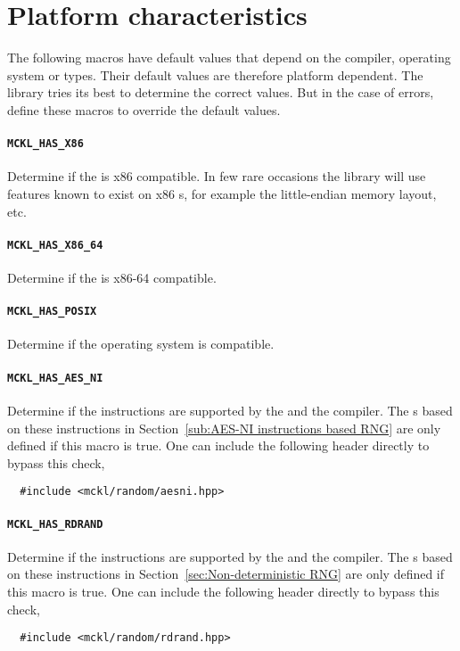 \section{Platform characteristics}
\label{sec:Platform characteristics}

The following macros have default values that depend on the compiler, operating
system or \cpu types. Their default values are therefore platform dependent.
The library tries its best to determine the correct values. But in the case of
errors, define these macros to override the default values.

\paragraph{\texttt{MCKL\_HAS\_X86}} Determine if the \cpu is x86 compatible. In
few rare occasions the library will use features known to exist on x86 \cpu{}s,
for example the little-endian memory layout, etc.

\paragraph{\texttt{MCKL\_HAS\_X86\_64}} Determine if the \cpu is x86-64
compatible.

\paragraph{\texttt{MCKL\_HAS\_POSIX}} Determine if the operating system is
\posix compatible.

\paragraph{\texttt{MCKL\_HAS\_AES\_NI}} Determine if the \aesni instructions
are supported by the \cpu and the compiler. The \rng{}s based on these
instructions in Section~\ref{sub:AES-NI instructions based RNG} are only
defined if this macro is true. One can include the following header directly to
bypass this check,
\begin{Verbatim}
  #include <mckl/random/aesni.hpp>
\end{Verbatim}

\paragraph{\texttt{MCKL\_HAS\_RDRAND}} Determine if the \rdrand instructions
are supported by the \cpu and the compiler. The \rng{}s based on these
instructions in Section~\ref{sec:Non-deterministic RNG} are only defined if
this macro is true. One can include the following header directly to bypass
this check,
\begin{Verbatim}
  #include <mckl/random/rdrand.hpp>
\end{Verbatim}

